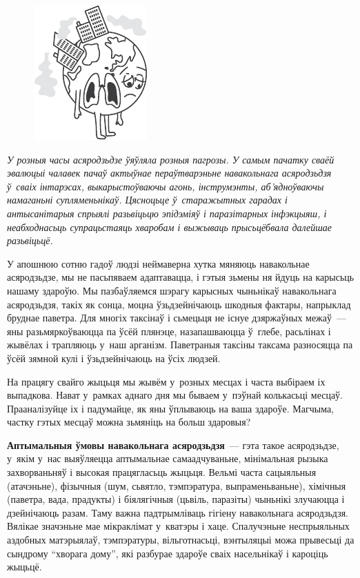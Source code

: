 \begin{figure}[htb!]
  \centering
  \includegraphics[scale=1.5]{willpower/ch11/1.pdf}
\end{figure}

\emph{У розныя часы асяродзьдзе ўяўляла розныя пагрозы. У самым пачатку сваёй эвалюцыі чалавек пачаў актыўнае пераўтварэньне навакольнага асяродзьдзя ў~сваіх інтарэсах, выкарыстоўваючы агонь, інструмэнты, аб'ядноўваючы намаганьні супляменьнікаў. Цясноцьце ў~старажытных гарадах і антысанітарыя спрыялі разьвіцьцю эпідэміяў і паразітарных інфэкцыяш, і неабходнасьць супрацьстаяць хваробам і выжываць прысьцёбвала далейшае разьвіцьцё.}

У апошнюю сотню гадоў людзі неймаверна хутка мяняюць навакольнае асяродзьдзе, мы не пасьпяваем адаптавацца, і гэтыя зьмены ня йдуць на карысьць нашаму здароўю. Мы пазбаўляемся шэрагу карысных чыньнікаў навакольнага асяродзьдзя, такіх як сонца, моцна ўзьдзейнічаюць шкодныя фактары, напрыклад бруднае паветра. Для многіх таксінаў і сьмецьця не існуе дзяржаўных межаў~--- яны разьмяркоўваюцца па ўсёй плянэце, назапашваюцца ў~глебе, расьлінах і жывёлах і трапляюць у~наш арганізм. Паветраныя таксіны таксама разносяцца па ўсёй зямной кулі і ўзьдзейнічаюць на ўсіх людзей.

На працягу свайго жыцьця мы жывём у~розных месцах і часта выбіраем іх выпадкова. Нават у~рамках аднаго дня мы бываем у~пэўнай колькасьці месцаў. Прааналізуйце іх і падумайце, як яны ўплываюць на ваша здароўе. Магчыма, частку гэтых месцаў можна зьмяніць на больш здаровыя?

\textbf{Аптымальныя ўмовы навакольнага асяродзьдзя}~--- гэта такое асяродзьдзе, у~якім у~нас выяўляецца аптымальнае самаадчуваньне, мінімальная рызыка захворваньняў і высокая працягласьць жыцьця. Вельмі часта сацыяльныя (атачэньне), фізычныя (шум, сьвятло, тэмпэратура, выпраменьваньне), хімічныя (паветра, вада, прадукты) і біялягічныя (цьвіль, паразіты) чыньнікі злучаюцца і дзейнічаюць разам. Таму важна падтрымліваць гігіену навакольнага асяродзьдзя. Вялікае значэньне мае мікраклімат у~кватэры і хаце. Спалучэньне неспрыяльных аздобных матэрыялаў, тэмпэратуры, вільготнасьці, вэнтыляцыі можа прывесьці да сындрому ``хворага дому'', які разбурае здароўе сваіх насельнікаў і кароціць жыцьцё.

